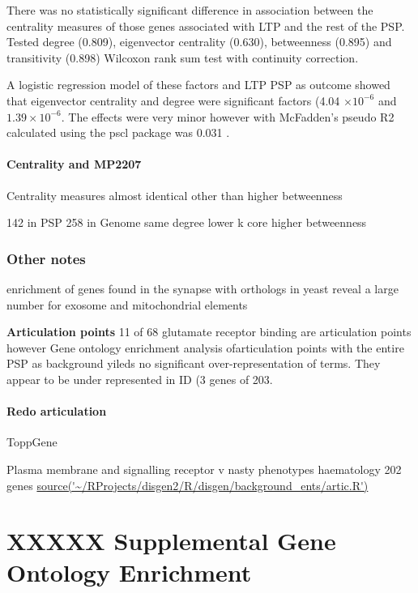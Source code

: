     There was no statistically significant difference in association between the centrality measures of those genes associated with LTP and the rest of the PSP. Tested degree (0.809), eigenvector centrality (0.630), betweenness (0.895) and transitivity (0.898) Wilcoxon rank sum test with continuity correction. 
    
    A logistic regression model of these factors and LTP PSP as outcome showed that eigenvector centrality and degree were significant factors (4.04 $\times 10^{-6}$ and $1.39 \times 10^{-6}$. The effects were very minor however with McFadden's pseudo R2 \cite{mcfadden1973conditional} calculated using the pscl package was  0.031 \cite{jackman2017package}.


\paragraph{Centrality and MP2207}

Centrality measures almost identical other than higher betweenness

142 in PSP 258 in Genome
same degree lower k core higher betweenness

\subsubsection{Other notes}


enrichment of genes found in the synapse with orthologs in yeast reveal a large number for exosome and mitochondrial elements




\textbf{Articulation points}
11 of 68 glutamate receptor binding are articulation points however Gene ontology enrichment analysis ofarticulation points with the entire PSP as background yileds no significant over-representation of terms. They appear to be under represented in ID (3 genes of 203.	 	


\paragraph{Redo articulation}
ToppGene

Plasma membrane and signalling receptor v nasty phenotypes
haematology
202 genes
\url{source('~/RProjects/disgen2/R/disgen/background_ents/artic.R')}



 
\section{XXXXX Supplemental Gene Ontology Enrichment}
